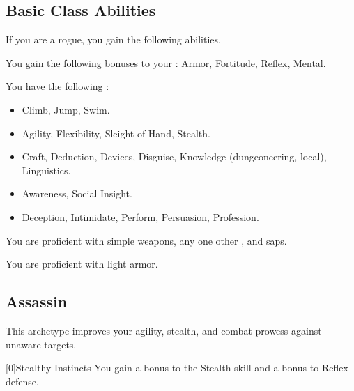     \subsection{Basic Class Abilities}
        If you are a rogue, you gain the following abilities.

        You gain the following bonuses to your :  Armor,  Fortitude,  Reflex,  Mental.

        You have the following :
        \begin{itemize}
            \item {} Climb, Jump, Swim.
            \item {} Agility, Flexibility, Sleight of Hand, Stealth.
            \item {} Craft, Deduction, Devices, Disguise, Knowledge (dungeoneering, local), Linguistics.
            \item {} Awareness, Social Insight.
            \item {} Deception, Intimidate, Perform, Persuasion, Profession.
        \end{itemize}

        You are proficient with simple weapons, any one other , and saps.

        You are proficient with light armor.

    \newpage
    \subsection{Assassin}
        This archetype improves your agility, stealth, and combat prowess against unaware targets.

        [0]{Stealthy Instincts} You gain a  bonus to the Stealth skill and a  bonus to Reflex defense.

